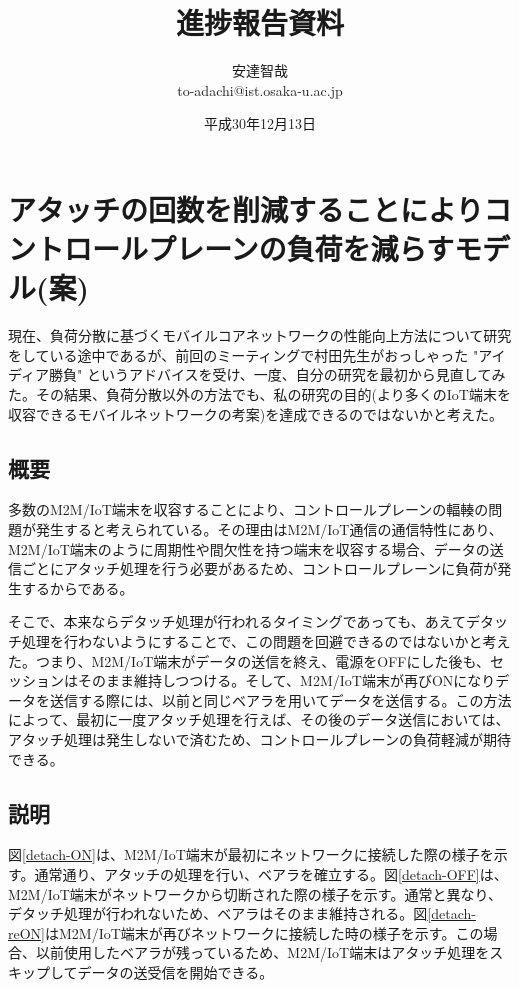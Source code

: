 \documentclass[a4j]{ujarticle}
\title{進捗報告資料}
\author{安達智哉\\to-adachi@ist.osaka-u.ac.jp}
\date{平成30年12月13日}
\begin{document}
\maketitle

\section{アタッチの回数を削減することによりコントロールプレーンの負荷を減らすモデル(案)}
現在、負荷分散に基づくモバイルコアネットワークの性能向上方法について研究をしている途中であるが、前回のミーティングで村田先生がおっしゃった "アイディア勝負" というアドバイスを受け、一度、自分の研究を最初から見直してみた。その結果、負荷分散以外の方法でも、私の研究の目的(より多くのIoT端末を収容できるモバイルネットワークの考案)を達成できるのではないかと考えた。



\subsection{概要}
多数のM2M/IoT端末を収容することにより、コントロールプレーンの輻輳の問題が発生すると考えられている。その理由はM2M/IoT通信の通信特性にあり、M2M/IoT端末のように周期性や間欠性を持つ端末を収容する場合、データの送信ごとにアタッチ処理を行う必要があるため、コントロールプレーンに負荷が発生するからである。

そこで、本来ならデタッチ処理が行われるタイミングであっても、あえてデタッチ処理を行わないようにすることで、この問題を回避できるのではないかと考えた。つまり、M2M/IoT端末がデータの送信を終え、電源をOFFにした後も、セッションはそのまま維持しつつける。そして、M2M/IoT端末が再びONになりデータを送信する際には、以前と同じベアラを用いてデータを送信する。この方法によって、最初に一度アタッチ処理を行えば、その後のデータ送信においては、アタッチ処理は発生しないで済むため、コントロールプレーンの負荷軽減が期待できる。

\subsection{説明}
図\ref{detach-ON}は、M2M/IoT端末が最初にネットワークに接続した際の様子を示す。通常通り、アタッチの処理を行い、ベアラを確立する。図\ref{detach-OFF}は、M2M/IoT端末がネットワークから切断された際の様子を示す。通常と異なり、デタッチ処理が行われないため、ベアラはそのまま維持される。図\ref{detach-reON}はM2M/IoT端末が再びネットワークに接続した時の様子を示す。この場合、以前使用したベアラが残っているため、M2M/IoT端末はアタッチ処理をスキップしてデータの送受信を開始できる。
\end{document}
